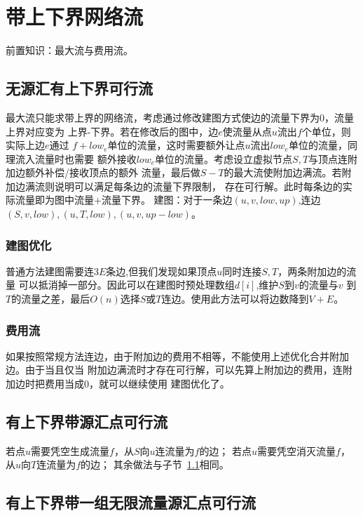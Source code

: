 \section{带上下界网络流}
前置知识：最大流与费用流。
\subsection{无源汇有上下界可行流}\label{LFA}
最大流只能求带上界的网络流，考虑通过修改建图方式使边的流量下界为0，流量上界对应变为
上界-下界。若在修改后的图中，边$e$使流量从点$u$流出$f$个单位，则实际上边$e$通过
$f+low_e$单位的流量，这时需要额外让点$u$流出$low_e$单位的流量，同理流入流量时也需要
额外接收$low_e$单位的流量。考虑设立虚拟节点$S,T$与顶点连附加边额外补偿/接收顶点的额外
流量，最后做$S-T$的最大流使附加边满流。若附加边满流则说明可以满足每条边的流量下界限制，
存在可行解。此时每条边的实际流量即为图中流量+流量下界。
建图：对于一条边$(u,v,low,up)$,连边$(S,v,low),(u,T,low),(u,v,up-low)$。

\subsubsection{建图优化}

普通方法建图需要连$3E$条边,但我们发现如果顶点$u$同时连接$S,T$，两条附加边的流量
可以抵消掉一部分。因此可以在建图时预处理数组$d[i]$,维护$S$到$v$的流量与$v$
到$T$的流量之差，最后$O(n)$选择$S$或$T$连边。使用此方法可以将边数降到$V+E$。

\subsubsection{费用流}

如果按照常规方法连边，由于附加边的费用不相等，不能使用上述优化合并附加边。由于当且仅当
附加边满流时才存在可行解，可以先算上附加边的费用，连附加边时把费用当成0，就可以继续使用
建图优化了。

\subsection{有上下界带源汇点可行流}

若点$u$需要凭空生成流量$f$，从$S$向$u$连流量为$f$的边；
若点$u$需要凭空消灭流量$f$，从$u$向$T$连流量为$f$的边；
其余做法与子节~\ref{LFA}相同。

\subsection{有上下界带一组无限流量源汇点可行流}

